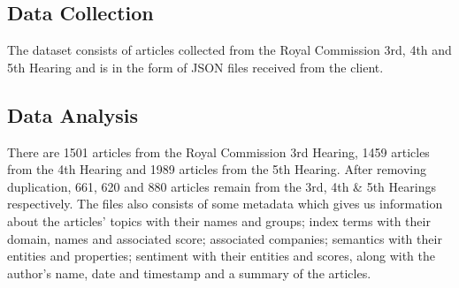 \documentclass[12pt]{article}
\begin{document}
\subsection{Data Collection}
The dataset consists of articles collected from the Royal Commission 3rd, 4th and 5th Hearing and is in the form of JSON files received from the client.
\subsection{Data Analysis}
There are 1501 articles from the Royal Commission 3rd Hearing, 1459 articles from the 4th Hearing and 1989 articles from the 5th Hearing. After removing duplication, 661, 620 and 880 articles remain from the 3rd, 4th \& 5th Hearings respectively. The files also consists of some metadata which gives us information about the articles’ topics with their names and groups; index terms with their domain, names and associated score; associated companies; semantics with their entities and properties; sentiment with their entities and scores, along with the author’s name, date and timestamp and a summary of the articles.
\end{document}
